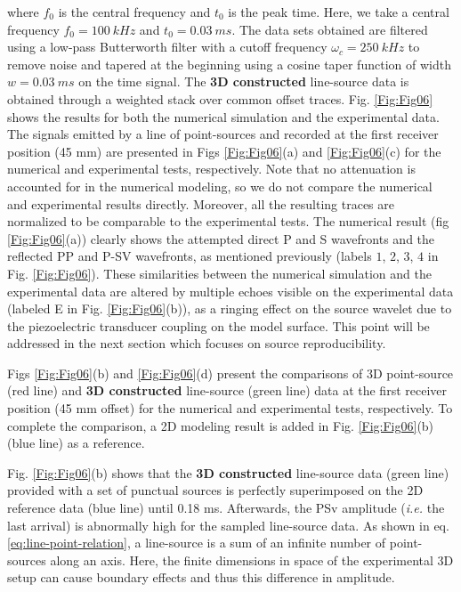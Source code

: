 \documentclass[extra,mreferee]{gji}
\newenvironment{violetnote}{\par\color{BlueViolet}}{\par}
\begin{document}
\begin{violetnote}
where $f_{0}$ is the central frequency and $t_{0}$ is the peak time. Here, we take a central frequency $f_{0}=100\ kHz$ and $t_{0}=0.03\ ms$. The data sets obtained are filtered using a low-pass Butterworth filter with a cutoff frequency $\omega_{c}=250\ kHz$ to remove noise and tapered at the beginning using a cosine taper function of width $w=0.03\ ms$ on the time signal. The \textbf{3D constructed} line-source data is obtained through a weighted stack over common offset traces. Fig. \ref{Fig:Fig06} shows the results for both the numerical simulation and the experimental data. The signals emitted by a line of point-sources and recorded at the first receiver position (45 mm) are presented in Figs \ref{Fig:Fig06}(a) and \ref{Fig:Fig06}(c) for the numerical and experimental tests, respectively. Note that no attenuation is accounted for in the numerical modeling, so we do not compare the numerical and experimental results directly. Moreover, all the resulting traces are normalized to be comparable to the experimental tests. The numerical result (fig \ref{Fig:Fig06}(a)) clearly shows the attempted direct P and S wavefronts and the reflected PP and P-SV wavefronts, as mentioned previously (labels $1$, $2$, $3$, $4$ in Fig. \ref{Fig:Fig06}). These similarities between the numerical simulation and the experimental data are altered by multiple echoes visible on the experimental data (labeled E in Fig. \ref{Fig:Fig06}(b)), as a ringing effect on the source wavelet due to the piezoelectric transducer coupling on the model surface. This point will be addressed in the next section which focuses on source reproducibility. 

Figs \ref{Fig:Fig06}(b) and \ref{Fig:Fig06}(d) present the comparisons of 3D point-source (red line) and \textbf{3D constructed} line-source (green line) data at the first receiver position (45 mm offset) for the numerical and experimental tests, respectively. To complete the comparison, a 2D modeling result is added in Fig. \ref{Fig:Fig06}(b) (blue line) as a reference.

Fig. \ref{Fig:Fig06}(b) shows that the \textbf{3D constructed} line-source data (green line) provided with a set of punctual sources is perfectly superimposed on the 2D reference data (blue line) until 0.18 ms. Afterwards, the PSv amplitude (\textit{i.e.} the last arrival) is abnormally high for the sampled line-source data. As shown in eq. \ref{eq:line-point-relation}, a line-source is a sum of an infinite number of point-sources along an axis. Here, the finite dimensions in space of the experimental 3D setup can cause boundary effects and thus this difference in amplitude.


\end{violetnote}
\end{document}
